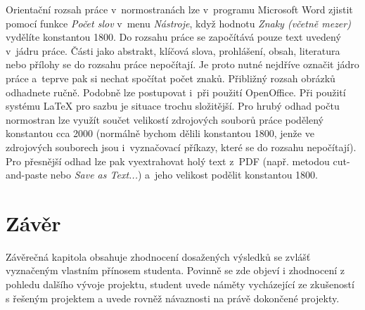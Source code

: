 \documentclass[english,cover]{fitthesis} %
\begin{document}
Orientační rozsah práce v~normostranách lze v~programu Microsoft Word zjistit pomocí funkce {\it Počet slov} v~menu {\it Nástroje}, když hodnotu {\it Znaky (včetně mezer)} vydělíte konstantou 1800. Do rozsahu práce se započítává pouze text uvedený v~jádru práce. Části jako abstrakt, klíčová slova, prohlášení, obsah, literatura nebo přílohy se do rozsahu práce nepočítají. Je proto nutné nejdříve označit jádro práce a~teprve pak si nechat spočítat počet znaků. Přibližný rozsah obrázků odhadnete ručně. Podobně lze postupovat i~při použití OpenOffice. Při použití systému LaTeX pro sazbu je situace trochu složitější. Pro hrubý odhad počtu normostran lze využít součet velikostí zdrojových souborů práce podělený konstantou cca 2000 (normálně bychom dělili konstantou 1800, jenže ve zdrojových souborech jsou i~vyznačovací příkazy, které se do rozsahu nepočítají). Pro přesnější odhad lze pak vyextrahovat holý text z~PDF (např. metodou cut-and-paste nebo {\it Save as Text...}) a~jeho velikost podělit konstantou 1800. 


\chapter{Závěr}
Závěrečná kapitola obsahuje zhodnocení dosažených výsledků se zvlášť vyznačeným vlastním přínosem studenta. Povinně se zde objeví i zhodnocení z pohledu dalšího vývoje projektu, student uvede náměty vycházející ze zkušeností s řešeným projektem a uvede rovněž návaznosti na právě dokončené projekty.












\ifczech
  
\else 
  
%  
\fi
  \begin{flushleft}
  \end{flushleft}
  \appendix
  
\end{document}
